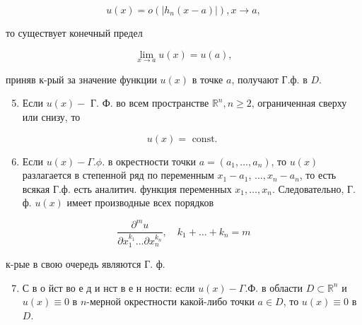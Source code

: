 \documentclass[10pt]{article}
\begin{document}
\[

u(x)=o\left(\left|h_{n}(x-a)\right|\right), x \rightarrow a,

\]



то существует конечный предел



\[

\lim _{x \rightarrow a} u(x)=u(a),

\]



приняв к-рый за значение функции $u(x)$ в точке $a$, получают Г.ф. в $D$.



\begin{enumerate}

  \setcounter{enumi}{4}

  \item Если $u(x)-$ Г. Ф. во всем пространстве $\mathbb{R}^{n}, n \geqslant 2$, ограниченная сверху или снизу, то

\end{enumerate}



\[

u(x)=\text { const. }

\]



\begin{enumerate}

  \setcounter{enumi}{5}

  \item Если $u(x)-\Gamma . \phi$. в окрестности точки $a=\left(a_{1}, \ldots, a_{n}\right)$, то $u(x)$ разлагается в степенной ряд по переменным $x_{1}-a_{1}$, $\ldots, x_{n}-a_{n}$, то есть всякая Г.ф. есть аналитич. функция переменных $x_{1}, \ldots, x_{n}$. Следовательно, Г. ф. $u(x)$ имеет производные всех порядков

\end{enumerate}



\[

\frac{\partial^{m} u}{\partial x_{1}^{k_{1}} \ldots \partial x_{n}^{k_{n}}}, \quad k_{1}+\ldots+k_{n}=m

\]



к-рые в свою очередь являются Г. ф.



\begin{enumerate}

  \setcounter{enumi}{6}

  \item С в о йст во е д и нст в е н ности: если $u(x)-\Gamma . Ф$. в области $D \subset \mathbb{R}^{n}$ и $u(x) \equiv 0$ в $n$-мерной окрестности какой-либо точки $a \in D$, то $u(x) \equiv 0$ в $D$.

\end{enumerate}
\end{document}

